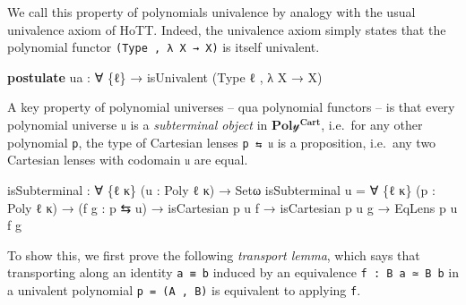 \documentclass[
  11pt,
  oneside,
  article]{memoir}
\newenvironment{Shaded}{}{}
\newcommand{\KeywordTok}[1]{\textcolor[rgb]{0.00,0.44,0.13}{\textbf{#1}}}
\newcommand{\NormalTok}[1]{#1}
\newcommand{\OtherTok}[1]{\textcolor[rgb]{0.00,0.44,0.13}{#1}}
\theoremstyle{definition}
\theoremstyle{plain}
\newcommand{\yon}{\mathcal{y}}
\newcommand{\0}{\textsf{0}}
\newcommand{\1}{\tn{\textsf{1}}}
\begin{document}
We call this property of polynomials univalence by analogy with the
usual univalence axiom of HoTT. Indeed, the univalence axiom simply
states that the polynomial functor \texttt{(Type\ ,\ λ\ X\ →\ X)} is
itself univalent.

\begin{Shaded}
\begin{Highlighting}[]
\KeywordTok{postulate}
\NormalTok{    ua }\OtherTok{:} \OtherTok{∀} \OtherTok{\{}\NormalTok{ℓ}\OtherTok{\}} \OtherTok{→}\NormalTok{ isUnivalent }\OtherTok{(}\NormalTok{Type ℓ , }\OtherTok{λ}\NormalTok{ X }\OtherTok{→}\NormalTok{ X}\OtherTok{)}
\end{Highlighting}
\end{Shaded}

A key property of polynomial universes -- qua polynomial functors -- is
that every polynomial universe \texttt{𝔲} is a \emph{subterminal object}
in \(\mathbf{Pol\yon^{Cart}}\), i.e.~for any other polynomial \texttt{p},
the type of Cartesian lenses \texttt{p\ ⇆\ 𝔲} is a proposition, i.e.~any
two Cartesian lenses with codomain \texttt{𝔲} are equal.

\begin{Shaded}
\begin{Highlighting}[]
\NormalTok{isSubterminal }\OtherTok{:} \OtherTok{∀} \OtherTok{\{}\NormalTok{ℓ κ}\OtherTok{\}} \OtherTok{(}\NormalTok{u }\OtherTok{:}\NormalTok{ Poly ℓ κ}\OtherTok{)} \OtherTok{→}\NormalTok{ Setω}
\NormalTok{isSubterminal u }\OtherTok{=} \OtherTok{∀} \OtherTok{\{}\NormalTok{ℓ\textquotesingle{} κ\textquotesingle{}}\OtherTok{\}} \OtherTok{(}\NormalTok{p }\OtherTok{:}\NormalTok{ Poly ℓ\textquotesingle{} κ\textquotesingle{}}\OtherTok{)}
                  \OtherTok{→} \OtherTok{(}\NormalTok{f g }\OtherTok{:}\NormalTok{ p ⇆ u}\OtherTok{)}
                  \OtherTok{→}\NormalTok{ isCartesian p u f}
                  \OtherTok{→}\NormalTok{ isCartesian p u g}
                  \OtherTok{→}\NormalTok{ EqLens p u f g}
\end{Highlighting}
\end{Shaded}

To show this, we first prove the following \emph{transport lemma}, which
says that transporting along an identity \texttt{a\ ≡\ b} induced by an
equivalence \texttt{f\ :\ B\ a\ ≃\ B\ b} in a univalent polynomial
\texttt{p\ =\ (A\ ,\ B)} is equivalent to applying \texttt{f}.
\end{document}
